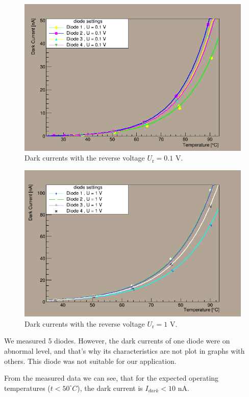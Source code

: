 \begin{figure}[H]
 \centering
 \includegraphics[scale=0.8]{./pictures/01V}
 \caption{Dark currents with the reverse voltage $U_\textrm{r}= 0.1$ V.}
 \label{01V}
\end{figure}

\begin{figure}[H]
 \centering
 \includegraphics[scale=0.8]{./pictures/1V}
 \caption{Dark currents with the reverse voltage $U_\textrm{r}= 1$ V.}
 \label{1V}
\end{figure}


We measured 5 diodes. However, the dark currents of one diode were on abnormal level, and that's why its characteristics are not plot in graphs with others. This diode was not suitable for our application.
\par

From the measured data we can see, that for the expected operating temperatures ($t < 50^{\circ}C$), the dark current is $I_{dark} < 10$ nA. 

